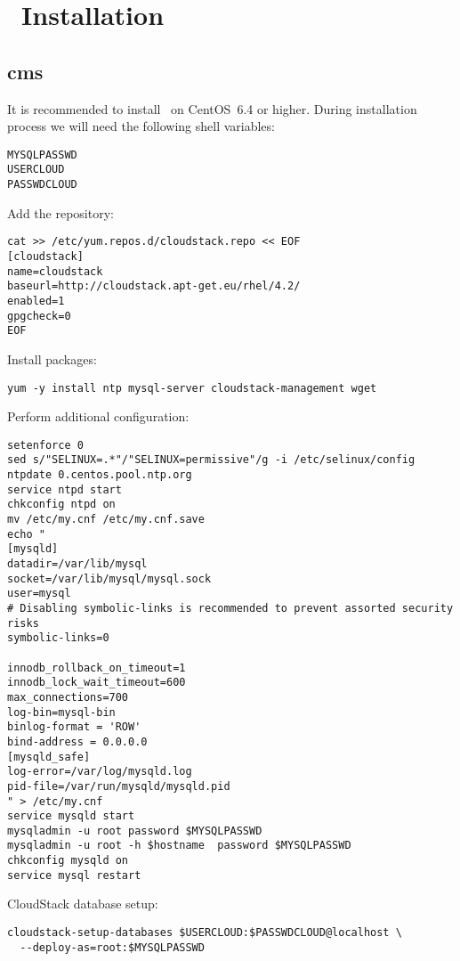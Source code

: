 \chapter{\cstack\ Installation}
\label{cpt:cloudstack}


\section{\acrlong{cms}}
\label{sct:cloudstack:cms}

It is recommended to install \cstack\ on CentOS~6.4 or higher.
During installation process we will need the following shell variables:
\begin{lstlisting}
MYSQLPASSWD
USERCLOUD
PASSWDCLOUD
\end{lstlisting}
Add the repository:
\begin{lstlisting}
cat >> /etc/yum.repos.d/cloudstack.repo << EOF
[cloudstack]
name=cloudstack
baseurl=http://cloudstack.apt-get.eu/rhel/4.2/
enabled=1
gpgcheck=0
EOF
\end{lstlisting}
Install packages:
\begin{lstlisting}
yum -y install ntp mysql-server cloudstack-management wget
\end{lstlisting}
Perform additional configuration:
\begin{lstlisting}
setenforce 0
sed s/"SELINUX=.*"/"SELINUX=permissive"/g -i /etc/selinux/config
ntpdate 0.centos.pool.ntp.org
service ntpd start
chkconfig ntpd on
mv /etc/my.cnf /etc/my.cnf.save
echo "
[mysqld]
datadir=/var/lib/mysql
socket=/var/lib/mysql/mysql.sock
user=mysql
# Disabling symbolic-links is recommended to prevent assorted security risks
symbolic-links=0

innodb_rollback_on_timeout=1
innodb_lock_wait_timeout=600
max_connections=700
log-bin=mysql-bin
binlog-format = 'ROW'
bind-address = 0.0.0.0
[mysqld_safe]
log-error=/var/log/mysqld.log
pid-file=/var/run/mysqld/mysqld.pid
" > /etc/my.cnf
service mysqld start
mysqladmin -u root password $MYSQLPASSWD
mysqladmin -u root -h $hostname  password $MYSQLPASSWD
chkconfig mysqld on
service mysql restart
\end{lstlisting}
CloudStack database setup:
\begin{lstlisting}
cloudstack-setup-databases $USERCLOUD:$PASSWDCLOUD@localhost \
  --deploy-as=root:$MYSQLPASSWD
\end{lstlisting}

